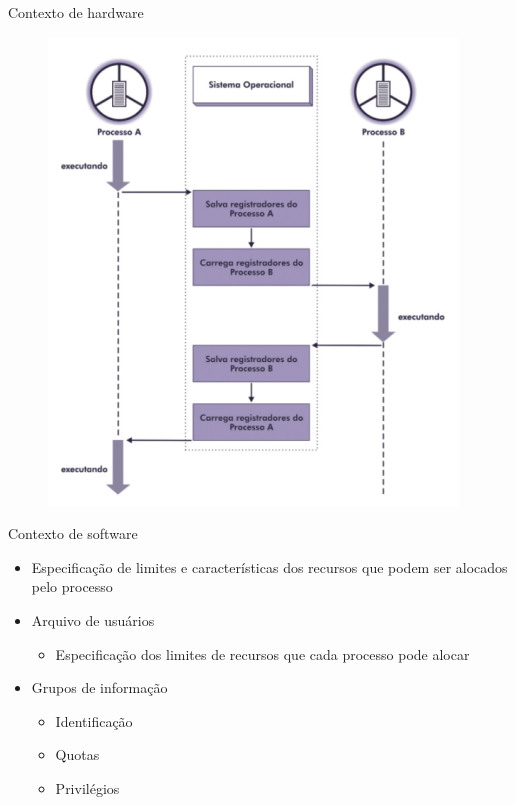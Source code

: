 \documentclass[aspectratio=169,
				xcolor=table]{beamer}
\begin{document}
	\begin{frame}{Contexto de hardware}
		\begin{figure}[hbtp]
			\centering
			\includegraphics[keepaspectratio, height=.8\textheight]{../figs/cap03/contextohard.png}
		\end{figure}
	\end{frame}
	
	\begin{frame}{Contexto de software}
		\begin{itemize}
			\item Especificação de limites e  características dos recursos que podem ser alocados pelo processo
			\vspace{1em}
			\item Arquivo de usuários
			\begin{itemize}
				\item Especificação dos limites de recursos que cada processo pode alocar		
			\end{itemize}
			\vspace{1em}
			\item Grupos de informação
			\begin{itemize}
				\item Identificação
				\item Quotas 
				\item Privilégios
			\end{itemize}
		\end{itemize}
	\end{frame}
	
\end{document}
